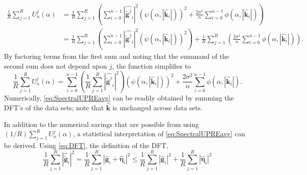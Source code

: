 \documentclass[12pt]{article}
\newcommand{\gdis}{\mathbf{g}}
\newcommand{\gnoise}{\widetilde{\mathbf{g}}}
\newcommand{\kdis}{\mathbf{k}}
\newcommand{\regparam}{\alpha}
\newcommand{\filt}{\phi}
\newcommand{\mfilt}{\psi}
\newcommand{\noiseSD}{\sigma}	%
\newcommand{\noise}{\bm{\eta}}	%
\newcommand{\U}{U}	%
\begin{document}
\begin{align*}
\frac{1}{R}\sum_{j=1}^R \U_n^j(\regparam) &= \frac{1}{R}\sum_{j=1}^R \left(\sum_{i = 0}^{n-1} |\widehat{\gnoise^j}_i|^2(\mfilt(\regparam,|\widehat{\kdis}_i|))^2 + \frac{2\noiseSD^2}{n}\sum_{i = 0}^{n-1} \filt(\regparam,|\widehat{\kdis}_i|)\right) \\
&= \frac{1}{R}\sum_{j=1}^R \left(\sum_{i = 0}^{n-1} |\widehat{\gnoise^j}_i|^2(\mfilt(\regparam,|\widehat{\kdis}_i|))^2\right) + \frac{1}{R}\sum_{j=1}^R \left(\frac{2\noiseSD^2}{n}\sum_{i = 0}^{n-1} \filt(\regparam,|\widehat{\kdis}_i|)\right).
\end{align*}
By factoring terms from the first sum and noting that the summand of the second sum does not depend upon $j$, the function simplifies to
\begin{equation}
\frac{1}{R}\sum_{j=1}^R \U_n^j(\regparam) =  \sum_{i = 0}^{n-1} \left(\frac{1}{R}\sum_{j=1}^R |\widehat{\gnoise^j}_i|^2\right)(\mfilt(\regparam,|\widehat{\kdis}_i|))^2 + \frac{2\noiseSD^2}{n}\sum_{i = 0}^{n-1} \filt(\regparam,|\widehat{\kdis}_i|).
\label{eq:SpectralUPREavg}
\end{equation}
Numerically, \eqref{eq:SpectralUPREavg} can be readily obtained by summing the DFT's of the data sets; note that $\widehat{\kdis}$ is unchanged across data sets. \par
In addition to the numerical savings that are possible from using $(1/R)\sum_{j=1}^R \U_n^j(\regparam)$, a statistical interpretation of \eqref{eq:SpectralUPREavg} can be derived. Using \eqref{eq:DFT}, the definition of the DFT,
\[\frac{1}{R}\sum_{j=1}^R |\widehat{\gnoise}_i|^2 = \frac{1}{R}\sum_{j=1}^R |\widehat{\gdis}_i + \widehat{\noise}_i|^2 \leq \frac{1}{R}\sum_{j=1}^R |\widehat{\gdis}_i|^2  + \frac{1}{R}\sum_{j=1}^R |\widehat{\noise}_i|^2 \] 
\end{document}
